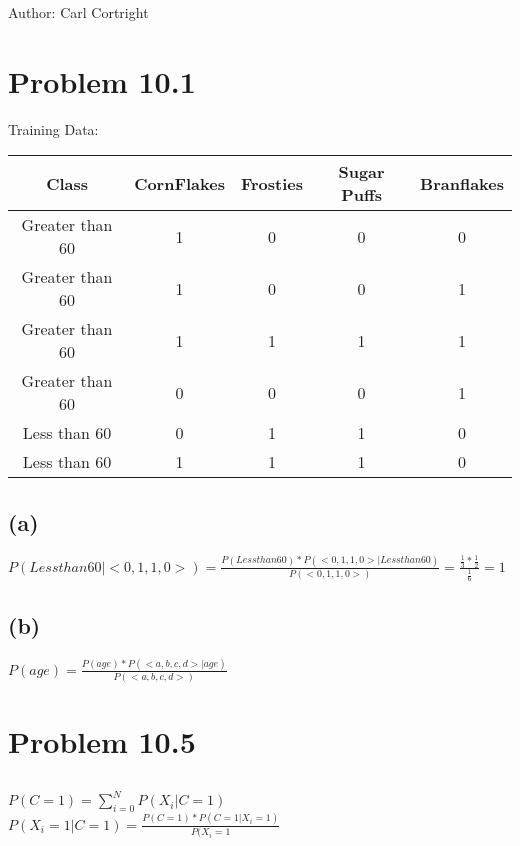\documentclass{article}
\begin{document}
Author: Carl Cortright

\section{Problem 10.1}

Training Data:\\

\begin{tabular}{c|cccc}

  Class & CornFlakes & Frosties & Sugar Puffs & Branflakes \\
  \hline
  Greater than 60 & 1 & 0 & 0 & 0\\
  Greater than 60 & 1 & 0 & 0 & 1\\
  Greater than 60 & 1 & 1 & 1 & 1\\
  Greater than 60 & 0 & 0 & 0 & 1\\
  Less than 60 & 0 & 1 & 1 & 0\\
  Less than 60 & 1 & 1 & 1 & 0\\
  

\end{tabular}

\subsection{(a)}

$P(Less than 60 | <0,1,1,0>) = \frac{P(Less than 60) * P(<0,1,1,0>|Less than 60)}{P(<0,1,1,0>)} = \frac{\frac{1}{3} * \frac{1}{2}}{\frac{1}{6}} = 1$

\subsection{(b)}

$P(age) = \frac{ P(age) * P(<a,b,c,d> | age) }{ P(<a,b,c,d>) }$

\section{Problem 10.5}

\subsection{}

$P(C=1) = \sum_{i=0}^N P(X_i | C=1)$ \\


$P(X_i = 1 | C = 1) = \frac{P(C=1) * P(C=1 | X_i=1) }{P(X_i = 1}$ \\
\end{document}

